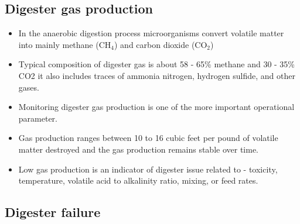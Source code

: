 \subsection{Digester gas production} 

                    \begin{itemize}
                        \item In the anaerobic digestion process microorganisms convert volatile matter into mainly methane (CH$_4$) and carbon dioxide (CO$_2$)
                        \item Typical composition of digester gas is about 58 - 65\% methane and 30 - 35\% CO2 it also includes traces of ammonia nitrogen, hydrogen sulfide, and other gases.
                        \item Monitoring digester gas production is one of the more important operational parameter.  
                        \item Gas production ranges between 10 to 16 cubic feet per pound of volatile matter destroyed and the gas production remains stable over time.
                        \item Low gas production is an indicator of digester issue related to - toxicity, temperature, volatile acid to alkalinity ratio, mixing, or feed rates.
                    \end{itemize}

\subsection{Digester failure}   

